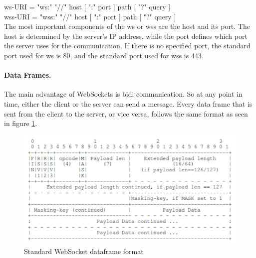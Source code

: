 \documentclass[a4paper, 11pt]{report}
\begin{document}
\indent	ws-URI  = "ws:" "//" host [ ":" port ] path [ "?" query ]\\
\indent	wss-URI = "wss:" "//" host [ ":" port ] path [ "?" query ]\\

The most important components of the ws or wss are the host and its port. The host is determined by the server's IP address, while the port defines which port the server uses for the communication. If there is no specified port, the standard port used for ws is 80, and the standard port used for wss is 443.
		
		\paragraph{Data Frames.}
The main advantage of WebSockets is bidi communication. So at any point in time, either the client or the server can send a message. Every data frame that is sent from the client to the server, or vice versa, follows the same format as seen in figure \ref{fig:dataFrame}.

	\begin{figure}[ht]
		\centering
		\includegraphics[scale=0.5]{images/WebSocketDataFrame.pdf}
		\caption{Standard WebSocket dataframe format}\label{fig:dataFrame}
	\end{figure}
\end{document}
